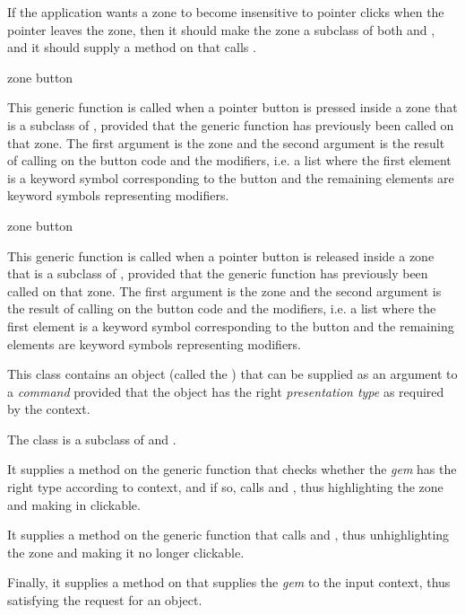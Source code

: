 If the application wants a zone to become insensitive to pointer clicks
when the pointer leaves the zone, then it should make the zone a
subclass of both  and , and it should
supply a method on  that calls . 

 {zone button}

This generic function is called when a pointer button is pressed
inside a zone that is a subclass of , provided that
the generic function  has previously been called on
that zone.  The first argument is the zone and the second argument is
the result of calling  on the button
code and the modifiers, i.e. a list where the first element is a
keyword symbol corresponding to the button and the remaining elements
are keyword symbols representing modifiers.

 {zone button}

This generic function is called when a pointer button is released
inside a zone that is a subclass of , provided that
the generic function  has previously been called on
that zone.  The first argument is the zone and the second argument is
the result of calling  on the button
code and the modifiers, i.e. a list where the first element is a
keyword symbol corresponding to the button and the remaining elements
are keyword symbols representing modifiers.


This class contains an object (called the ) that can be
supplied as an argument to a \emph{command} provided that the object
has the right \emph{presentation type} as required by the context. 

The class  is a subclass of  and
.  

It supplies a method on the generic function  that checks
whether the \emph{gem} has the right type according to context, and if
so, calls  and , thus highlighting the
zone and making in clickable.

It supplies a method on the generic function  that calls
 and ,  thus unhighlighting the zone
and making it no longer clickable. 

Finally, it supplies a method on  that supplies the
\emph{gem} to the input context, thus satisfying the request for an
object. 

